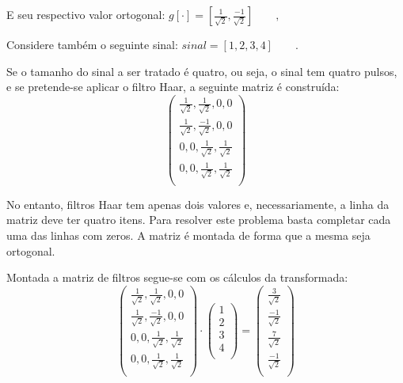 \documentclass[a4paper,12pt,openright,oneside]{book}
\newenvironment{myenv}[1]
  {\begin{spacing}{#1}}
  {\end{spacing}}
\begin{document}
\begin{myenv}{1.5}
				\par E seu respectivo valor ortogonal:
				$g[\cdot] = [\frac{1}{\sqrt{2}}, \frac{-1}{\sqrt{2}}]\qquad,$
				
				\par Considere também o seguinte sinal:	$sinal = [1,2,3,4]\qquad.$

				\par Se o tamanho do sinal a ser tratado é quatro, ou seja, o sinal tem quatro pulsos, e se pretende-se aplicar o filtro Haar, a seguinte matriz é construída:
				\begin{equation}
					\begin{pmatrix}
						\frac{1}{\sqrt{2}}, \frac{1}{\sqrt{2}}, 0, 0\\
						\frac{1}{\sqrt{2}}, \frac{-1}{\sqrt{2}}, 0, 0\\
						0, 0, \frac{1}{\sqrt{2}}, \frac{1}{\sqrt{2}}\\
						0, 0, \frac{1}{\sqrt{2}}, \frac{1}{\sqrt{2}}\\
					\end{pmatrix} 
				\end{equation}
				\par No entanto, filtros Haar tem apenas dois valores e, necessariamente, a linha da matriz deve ter quatro itens. Para resolver este problema basta completar cada uma das linhas com zeros. A matriz é montada de forma que a mesma seja ortogonal.

				\par Montada a matriz de filtros segue-se com os cálculos da transformada:
				\begin{equation}
					\begin{pmatrix}
						\frac{1}{\sqrt{2}}, \frac{1}{\sqrt{2}}, 0, 0\\
						\frac{1}{\sqrt{2}}, \frac{-1}{\sqrt{2}}, 0, 0\\
						0, 0, \frac{1}{\sqrt{2}}, \frac{1}{\sqrt{2}}\\
						0, 0, \frac{1}{\sqrt{2}}, \frac{1}{\sqrt{2}}\\
					\end{pmatrix} 
					\cdot
					\begin{pmatrix}
						1\\
						2\\
						3\\
						4\\
					\end{pmatrix} 
					=
					\begin{pmatrix}
						\frac{3}{\sqrt{2}}\\
						\frac{-1}{\sqrt{2}}\\
						\frac{7}{\sqrt{2}}\\
						\frac{-1}{\sqrt{2}}\\
					\end{pmatrix}
				\end{equation}
				

\end{myenv}
\end{document}
